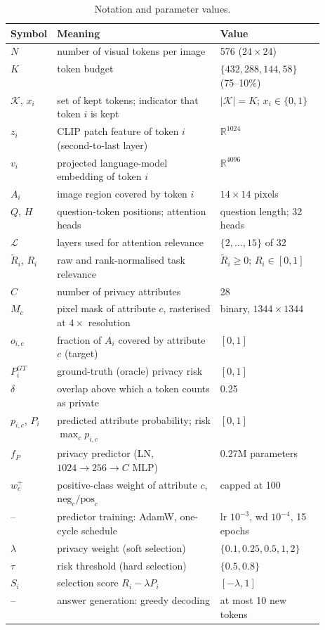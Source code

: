 \begin{table}[t]
\centering\small
\caption{Notation and parameter values.}
\label{tab:notation}
\begin{tabular}{@{}lp{0.52\linewidth}l@{}}
\toprule
Symbol & Meaning & Value \\
\midrule
$N$ & number of visual tokens per image & 576 ($24{\times}24$) \\
$K$ & token budget & $\{432, 288, 144, 58\}$ (75--10\%) \\
$\mathcal{K}$, $x_i$ & set of kept tokens; indicator that token $i$ is kept & $|\mathcal{K}|=K$; $x_i\in\{0,1\}$ \\
$z_i$ & CLIP patch feature of token $i$ (second-to-last layer) & $\mathbb{R}^{1024}$ \\
$v_i$ & projected language-model embedding of token $i$ & $\mathbb{R}^{4096}$ \\
$A_i$ & image region covered by token $i$ & $14{\times}14$ pixels \\
$Q$, $H$ & question-token positions; attention heads & question length; 32 heads \\
$\mathcal{L}$ & layers used for attention relevance & $\{2,\dots,15\}$ of 32 \\
$\tilde R_i$, $R_i$ & raw and rank-normalised task relevance & $\tilde R_i\ge 0$; $R_i\in[0,1]$ \\
$C$ & number of privacy attributes & 28 \\
$M_c$ & pixel mask of attribute $c$, rasterised at $4\times$ resolution & binary, $1344{\times}1344$ \\
$o_{i,c}$ & fraction of $A_i$ covered by attribute $c$ (target) & $[0,1]$ \\
$P^{GT}_i$ & ground-truth (oracle) privacy risk & $[0,1]$ \\
$\delta$ & overlap above which a token counts as private & 0.25 \\
$p_{i,c}$, $P_i$ & predicted attribute probability; risk $\max_c p_{i,c}$ & $[0,1]$ \\
$f_P$ & privacy predictor (LN, $1024{\to}256{\to}C$ MLP) & 0.27M parameters \\
$w^+_c$ & positive-class weight of attribute $c$, $\mathrm{neg}_c/\mathrm{pos}_c$ & capped at 100 \\
-- & predictor training: AdamW, one-cycle schedule & lr $10^{-3}$, wd $10^{-4}$, 15 epochs \\
$\lambda$ & privacy weight (soft selection) & $\{0.1, 0.25, 0.5, 1, 2\}$ \\
$\tau$ & risk threshold (hard selection) & $\{0.5, 0.8\}$ \\
$S_i$ & selection score $R_i-\lambda P_i$ & $[-\lambda, 1]$ \\
-- & answer generation: greedy decoding & at most 10 new tokens \\
\bottomrule
\end{tabular}
\end{table}
